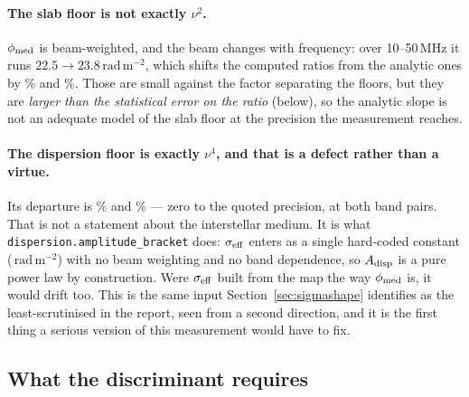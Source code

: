 \documentclass[11pt]{article}
\newcommand{\rmu}{\ensuremath{\mathrm{rad\,m^{-2}}}}
\newcommand{\code}[1]{\texttt{#1}}
\begin{document}
\paragraph{The slab floor is not exactly $\nu^{2}$.} $\phi_{\rm med}$
is beam-weighted, and the beam changes with frequency: over
10--50\,MHz it runs $22.5 \to 23.8$\,\rmu, which shifts the computed
ratios from the analytic ones by \slopeDepartSlabFiftyThirty\% and
\slopeDepartSlabThirtyTen\%. Those are small against the factor
separating the floors, but they are \emph{larger than the statistical
error on the ratio} (below), so the analytic slope is not an adequate
model of the slab floor at the precision the measurement reaches.

\paragraph{The dispersion floor is exactly $\nu^{4}$, and that is a
defect rather than a virtue.} Its departure is
\slopeDepartDispFiftyThirty\% and \slopeDepartDispThirtyTen\% --- zero
to the quoted precision, at both band pairs. That is not a statement
about the interstellar medium. It is what
\code{dispersion.amplitude\_bracket} does: $\sigma_{\rm eff}$ enters as
a single hard-coded constant (\sigmaEff\,\rmu) with no beam weighting
and no band dependence, so $A_{\rm disp}$ is a pure power law by
construction. Were $\sigma_{\rm eff}$ built from the map the way
$\phi_{\rm med}$ is, it would drift too. This is the same input
Section~\ref{sec:sigmashape} identifies as the least-scrutinised in the
report, seen from a second direction, and it is the first thing a
serious version of this measurement would have to fix.

\subsection{What the discriminant requires}
\label{sec:sloperequirement}
\end{document}

